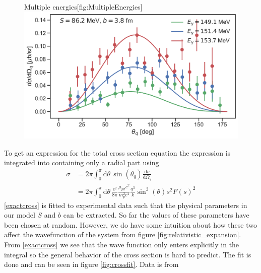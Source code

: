 \begin{figure}[H]
    \begin{sidecaption}{Multiple energies}[fig:MultipleEnergies]
    \includegraphics[width=\linewidth]{Figures/MultiDiffcross.pdf}
    \end{sidecaption}
\end{figure}
To get an expression for the total cross section equation the expression is integrated into containing only a radial part using
\begin{align} \label{exactcross}
    \sigma & = 2\pi \int_0^\pi \text{d}\theta \, \sin(\theta_q) \frac{\text{d}\sigma}{\text{d}\Omega_q} \\ &= 2\pi \int_0^\pi \text{d}\theta \, \frac{e^2}{8\pi}\frac{\mu_{p\pi}c^2}{m_p^2c^4}\frac{q^3}{k}\sin^3(\theta) s^2 F(s)^2
\end{align}
\eqref{exactcross} is fitted to experimental data such that the physical parameters in our model $S$ and $b$ can be extracted. So far the values of these parameters have been chosen at random. However, we do have some intuition about how these two affect the wavefunction of the system from figure \ref{fig:relativistic_expansion}. From \eqref{exactcross} we see that the wave function only enters explicitly in the integral so the general behavior of the cross section is hard to predict. The fit is done and can be seen in figure \ref{fig:crossfit}. Data is from \cite[]{Schmidt_2001}
